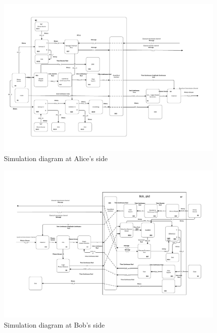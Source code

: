 \begin{figure}[h]
    \centering
        \includegraphics[clip, trim=0cm 0cm 0cm 0cm, width=1.00\textwidth]{./sdf/bb84_with_discrete_variables/figures_raw/Simulation_Alice_bb84.pdf}
    \caption{Simulation diagram at Alice's side}\label{alicesimulation}
\end{figure}


\begin{figure}[h]
    \centering
        \includegraphics[clip, trim=0cm 0cm 0cm 0cm, width=1.00\textwidth]{./sdf/bb84_with_discrete_variables/figures_raw/Simulation_Bob_bb84.pdf}
    \caption{Simulation diagram at Bob's side}\label{bobsimulation}
\end{figure}

